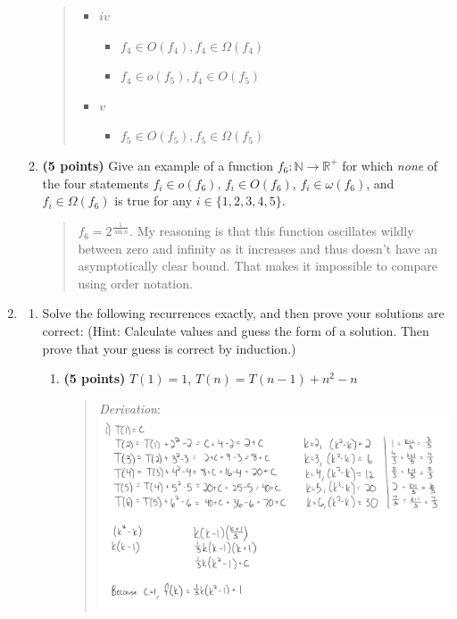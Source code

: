 \documentclass[11pt]{article}
\begin{document}
\begin{enumerate}[leftmargin=*]
\begin{enumerate}
\begin{quote}
\begin{itemize}
\begin{itemize}
    \end{itemize}
    \item $iv$
    \begin{itemize}
      \item $f_4 \in O(f_4), f_4 \in \Omega(f_4)$ 
      \item $f_4 \in o(f_5), f_4 \in O(f_5)$ 
    \end{itemize}
    \item $v$ 
    \begin{itemize}
      \item $f_5 \in O(f_5), f_5 \in \Omega(f_5)$ 
    \end{itemize}
  \end{itemize}
  
\end{quote}
\item
{\bf (5 points)}
Give an example of a function $f_6: \mathbb{N} \to \mathbb{R}^+$ for which \emph{none} of the four statements $f_i \in o(f_6)$, $f_i \in O(f_6)$, $f_i \in \omega(f_6)$, and $f_i \in \Omega(f_6)$ is true for any $i \in \{1,2,3,4,5\}$.
\begin{quote}
  \color{purple}
  $f_6 = 2^{\frac{1}{\sin n}}$. My reasoning is that this function oscillates wildly between zero and infinity as it increases and thus doesn't have an asymptotically clear bound. That makes it impossible to compare using order notation.
  
\end{quote}
\end{enumerate}

\item \begin{enumerate}
    \item Solve the following recurrences exactly, and then prove your solutions are correct:
    (Hint: Calculate values and guess the form of a solution. Then prove that your guess is correct by induction.)
    \begin{enumerate}
        \item
        {\bf (5 points)} 
        $T(1) = 1$, $T(n) = T(n-1) + n^2 - n$
        \begin{quote}
          \color{purple}
          \medskip
          \textit{Derivation}: \\
          \includegraphics[width=0.8\linewidth]{"./pics/4ai.png"}


\end{quote}
\end{enumerate}
\end{enumerate}
\end{enumerate}
\end{document}
